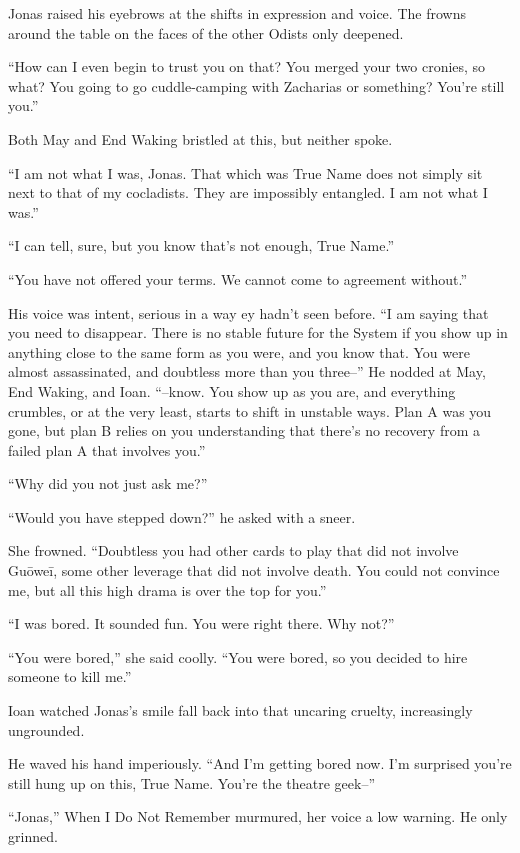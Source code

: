 Jonas raised his eyebrows at the shifts in expression and voice. The frowns around the table on the faces of the other Odists only deepened.

``How can I even begin to trust you on that? You merged your two cronies, so what? You going to go cuddle-camping with Zacharias or something? You're still you.''

Both May and End Waking bristled at this, but neither spoke.

``I am not what I was, Jonas. That which was True Name does not simply sit next to that of my cocladists. They are impossibly entangled. I am not what I was.''

``I can tell, sure, but you know that's not enough, True Name.''

``You have not offered your terms. We cannot come to agreement without.''

His voice was intent, serious in a way ey hadn't seen before. ``I am saying that you need to disappear. There is no stable future for the System if you show up in anything close to the same form as you were, and you know that. You were almost assassinated, and doubtless more than you three--'' He nodded at May, End Waking, and Ioan. ``--know. You show up as you are, and everything crumbles, or at the very least, starts to shift in unstable ways. Plan A was you gone, but plan B relies on you understanding that there's no recovery from a failed plan A that involves you.''

``Why did you not just ask me?''

``Would you have stepped down?'' he asked with a sneer.

She frowned. ``Doubtless you had other cards to play that did not involve Guōweī, some other leverage that did not involve death. You could not convince me, but all this high drama is over the top for you.''

``I was bored. It sounded fun. You were right there. Why not?''

``You were bored,'' she said coolly. ``You were bored, so you decided to hire someone to kill me.''

Ioan watched Jonas's smile fall back into that uncaring cruelty, increasingly ungrounded.

He waved his hand imperiously. ``And I'm getting bored now. I'm surprised you're still hung up on this, True Name. You're the theatre geek--''

``Jonas,'' When I Do Not Remember murmured, her voice a low warning. He only grinned.

